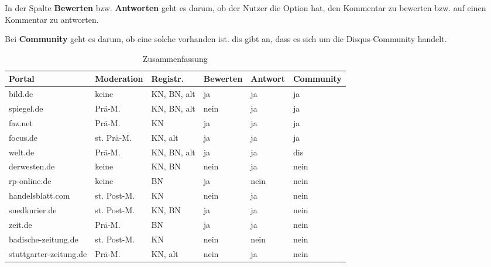 In der Spalte {\bfseries Bewerten} bzw. {\bfseries Antworten} geht es darum, ob der Nutzer die Option hat, den Kommentar
zu bewerten bzw. auf einen Kommentar zu antworten.

Bei {\bfseries Community} geht es darum, ob eine solche vorhanden ist. dis gibt an, dass es sich um die Disqus-Community
handelt.



\begin{table}
  \footnotesize
  \caption{Zusammenfassung\label{tab:zus}}
  \begin{tabular}{p{28mm}*{5}{l}}

    \\\toprule
    \bfseries Portal & \bfseries Moderation & \bfseries Registr. & \bfseries Bewerten & \bfseries Antwort & \bfseries Community\\*\toprule

bild.de
& keine
& KN, BN, alt
& ja
& ja
& ja
\\*\midrule

spiegel.de
& Prä-M.
& KN, BN, alt
& nein
& ja
& ja
\\*\midrule

faz.net
& Prä-M.
& KN
& ja
& ja
& ja
\\*\midrule

focus.de
& st. Prä-M.
& KN, alt
& ja
& ja
& ja
\\*\midrule

welt.de
& Prä-M.
& KN, BN, alt
& ja
& ja
& dis
\\*\midrule

derwesten.de
& keine
& KN, BN
& nein
& ja
& nein
\\*\midrule

rp-online.de
& keine
& BN
& ja
& nein
& nein
\\*\midrule

handelsblatt.com
& st. Post-M.
& KN
& nein
& ja
& nein
\\*\midrule

suedkurier.de
& st. Post-M.
& KN, BN
& ja
& ja
& nein
\\*\midrule

zeit.de
& Prä-M.
& BN
& ja
& ja
& nein
\\*\midrule

badische-zeitung.de
& st. Post-M.
& KN
&nein
&nein
& nein
\\*\midrule

stuttgarter-zeitung.de
& Prä-M.
& KN, alt
& nein
& ja
& nein
\\*\midrule


\end{tabular}
\end{table}
